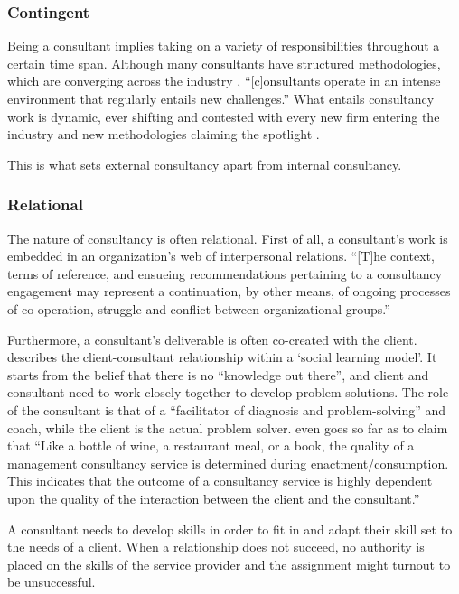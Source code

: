 \documentclass[12pt]{article}
\begin{document}
\hypertarget{contingent}{%
\subsubsection{Contingent}\label{contingent}}

Being a consultant implies taking on a variety of responsibilities
throughout a certain time span. Although many consultants have
structured methodologies, which are converging across the industry
\citep[ 17]{werr1986}, ``{[}c{]}onsultants operate in an intense
environment that regularly entails new challenges.'' \citep[
138]{chowdhury2021} What entails consultancy work is dynamic, ever
shifting and contested with every new firm entering the industry and new
methodologies claiming the spotlight \citep[ 24]{kipping2002}.

This is what sets external consultancy apart from internal consultancy.

\hypertarget{relational}{%
\subsubsection{Relational}\label{relational}}

The nature of consultancy is often relational. First of all, a
consultant's work is embedded in an organization's web of interpersonal
relations. ``{[}T{]}he context, terms of reference, and ensueing
recommendations pertaining to a consultancy engagement may represent a
continuation, by other means, of ongoing processes of co-operation,
struggle and conflict between organizational groups.''
\citep{bloomfield1995}

Furthermore, a consultant's deliverable is often co-created with the
client. \citet[290-297]{nikolova2009} describes the client-consultant
relationship within a `social learning model'. It starts from the belief
that there is no ``knowledge out there'', and client and consultant need
to work closely together to develop problem solutions. The role of the
consultant is that of a ``facilitator of diagnosis and problem-solving''
and coach, while the client is the actual problem solver.
\citet[22]{clark1998} even goes so far as to claim that ``Like a bottle
of wine, a restaurant meal, or a book, the quality of a management
consultancy service is determined during enactment/consumption. This
indicates that the outcome of a consultancy service is highly dependent
upon the quality of the interaction between the client and the
consultant.''

A consultant needs to develop skills in order to fit in and adapt their
skill set to the needs of a client. When a relationship does not
succeed, no authority is placed on the skills of the service provider
\citep[ 10]{furusten2000} and the assignment might turnout to be
unsuccessful.
\end{document}
